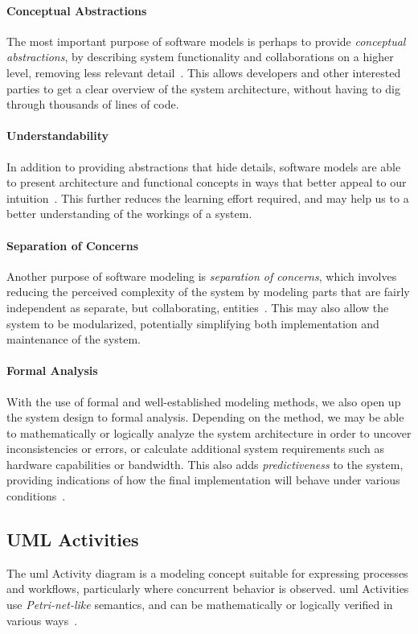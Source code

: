 \paragraph{Conceptual Abstractions} The most important purpose of software models is perhaps to provide \emph{conceptual abstractions}, by describing system functionality and collaborations on a higher level, removing less relevant detail~\cite{braek:itut_methodologies}. This allows developers and other interested parties to get a clear overview of the system architecture, without having to dig through thousands of lines of code.

\paragraph{Understandability} In addition to providing abstractions that hide details, software models are able to present architecture and functional concepts in ways that better appeal to our intuition~\cite{selic:model_driven_development}. This further reduces the learning effort required, and may help us to a better understanding of the workings of a system.

\paragraph{Separation of Concerns} Another purpose of software modeling is \emph{separation of concerns}, which involves reducing the perceived complexity of the system by modeling parts that are fairly independent as separate, but collaborating, entities~\cite{braek:itut_methodologies}. This may also allow the system to be modularized, potentially simplifying both implementation and maintenance of the system.

\paragraph{Formal Analysis} With the use of formal and well-established modeling methods, we also open up the system design to formal analysis. Depending on the method, we may be able to mathematically or logically analyze the system architecture in order to uncover inconsistencies or errors, or calculate additional system requirements such as hardware capabilities or bandwidth. This also adds \emph{predictiveness} to the system, providing indications of how the final implementation will behave under various conditions~\cite{selic:model_driven_development}.

\subsection{UML Activities}
\label{sec:uml_activities}
The \gls{uml} Activity diagram is a modeling concept suitable for expressing processes and workflows, particularly where concurrent behavior is observed. \gls{uml} Activities use \emph{Petri-net-like} semantics, and can be mathematically or logically verified in various ways~\cite{eshuis:uml_verification, kraemer:arctis, storrle:uml_verification}.

